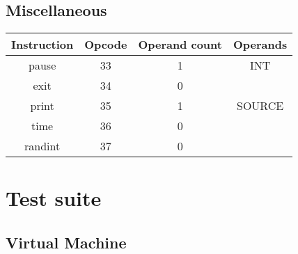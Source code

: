\documentclass[manuscript,screen,nonacm]{acmart}
\begin{document}
\subsection{Miscellaneous}
\begin{center}
\begin{tabular}{|c|c|c|c|}
    \hline
    Instruction & Opcode & Operand count & Operands \\
    \hline
    pause & 33 & 1 & INT \\
    exit & 34 & 0 & \\
    print & 35 & 1 & SOURCE \\
    time & 36 & 0 & \\
    randint & 37 & 0 & \\
    \hline
\end{tabular}
\end{center}

\section{Test suite}
\subsection{Virtual Machine}
\end{document}
